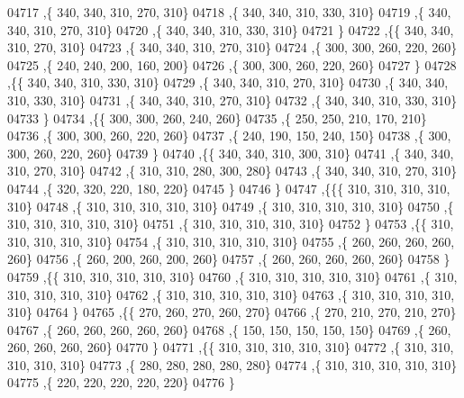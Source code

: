 \begin{DoxyCode}
04717     ,\{   340,   340,   310,   270,   310\}
04718     ,\{   340,   340,   310,   330,   310\}
04719     ,\{   340,   340,   310,   270,   310\}
04720     ,\{   340,   340,   310,   330,   310\}
04721     \}
04722    ,\{\{   340,   340,   310,   270,   310\}
04723     ,\{   340,   340,   310,   270,   310\}
04724     ,\{   300,   300,   260,   220,   260\}
04725     ,\{   240,   240,   200,   160,   200\}
04726     ,\{   300,   300,   260,   220,   260\}
04727     \}
04728    ,\{\{   340,   340,   310,   330,   310\}
04729     ,\{   340,   340,   310,   270,   310\}
04730     ,\{   340,   340,   310,   330,   310\}
04731     ,\{   340,   340,   310,   270,   310\}
04732     ,\{   340,   340,   310,   330,   310\}
04733     \}
04734    ,\{\{   300,   300,   260,   240,   260\}
04735     ,\{   250,   250,   210,   170,   210\}
04736     ,\{   300,   300,   260,   220,   260\}
04737     ,\{   240,   190,   150,   240,   150\}
04738     ,\{   300,   300,   260,   220,   260\}
04739     \}
04740    ,\{\{   340,   340,   310,   300,   310\}
04741     ,\{   340,   340,   310,   270,   310\}
04742     ,\{   310,   310,   280,   300,   280\}
04743     ,\{   340,   340,   310,   270,   310\}
04744     ,\{   320,   320,   220,   180,   220\}
04745     \}
04746    \}
04747   ,\{\{\{   310,   310,   310,   310,   310\}
04748     ,\{   310,   310,   310,   310,   310\}
04749     ,\{   310,   310,   310,   310,   310\}
04750     ,\{   310,   310,   310,   310,   310\}
04751     ,\{   310,   310,   310,   310,   310\}
04752     \}
04753    ,\{\{   310,   310,   310,   310,   310\}
04754     ,\{   310,   310,   310,   310,   310\}
04755     ,\{   260,   260,   260,   260,   260\}
04756     ,\{   260,   200,   260,   200,   260\}
04757     ,\{   260,   260,   260,   260,   260\}
04758     \}
04759    ,\{\{   310,   310,   310,   310,   310\}
04760     ,\{   310,   310,   310,   310,   310\}
04761     ,\{   310,   310,   310,   310,   310\}
04762     ,\{   310,   310,   310,   310,   310\}
04763     ,\{   310,   310,   310,   310,   310\}
04764     \}
04765    ,\{\{   270,   260,   270,   260,   270\}
04766     ,\{   270,   210,   270,   210,   270\}
04767     ,\{   260,   260,   260,   260,   260\}
04768     ,\{   150,   150,   150,   150,   150\}
04769     ,\{   260,   260,   260,   260,   260\}
04770     \}
04771    ,\{\{   310,   310,   310,   310,   310\}
04772     ,\{   310,   310,   310,   310,   310\}
04773     ,\{   280,   280,   280,   280,   280\}
04774     ,\{   310,   310,   310,   310,   310\}
04775     ,\{   220,   220,   220,   220,   220\}
04776     \}

\end{DoxyCode}
